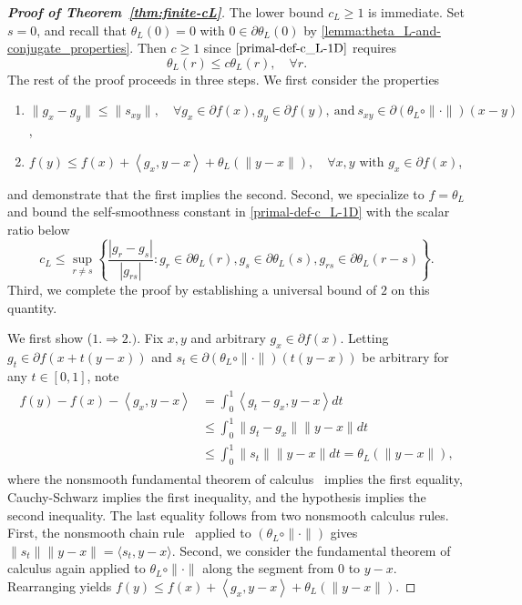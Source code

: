 \documentclass[11pt, hidelinks]{article}
\numberwithin{equation}{section}
\theoremstyle{thmstyletwo}%
\numberwithin{equation}{section}
\newcommand{\inner}[2]{\left\langle {#1}, {#2} \right\rangle}
\begin{document}
\begin{proof}[{\bf Proof of Theorem~\ref{thm:finite-cL}}] 
The lower bound $c_L \geq 1$ is immediate. Set $s = 0$, and recall that $\theta_L(0) = 0$ with $0 \in \partial \theta_L(0)$ by \cref{lemma:theta_L-and-conjugate_properties}. Then $c \geq 1$ since $\eqref{primal-def-c_L-1D}$ requires $$\theta_L(r) \leq c \theta_L(r), \quad \forall r.$$
The rest of the proof proceeds in three steps. We first consider the properties
\begin{enumerate}
        \item $\|g_x-g_y\| \leq \|s_{xy}\|, \quad \forall g_x \in \partial f(x), g_y \in \partial f(y), \ \text{and} \ s_{xy}  \in \partial (\theta_L \circ \|\cdot\|)(x-y)$,
       \item $f(y) \leq f(x) + \inner{g_x}{y-x}+\theta_L(\|y-x\|), \quad \forall x,y \text{ with } g_x \in \partial f(x)$,
       \end{enumerate}
and demonstrate that the first implies the second. Second, we specialize to $f = \theta_L$ and bound the self-smoothness constant in \eqref{primal-def-c_L-1D} with the scalar ratio below
\begin{equation}\label{eq:c_L bound}c_L \leq \sup_{r \ne s} \left\{\frac{|g_r-g_s|}{|g_{rs}|} : g_r \in \partial \theta_L(r), g_s \in \partial \theta_L(s), g_{rs} \in \partial \theta_L(r-s)\right\}.\end{equation}
Third, we complete the proof by establishing a universal bound of $2$ on this quantity.


We first show ($1. \Longrightarrow 2.)$. Fix $x,y$ and arbitrary $g_x \in \partial f(x)$. Letting $g_t \in \partial f(x+t(y-x))$ and $s_{t} \in \partial (\theta_L \circ \|\cdot\|)(t(y-x))$ be arbitrary for any $ t\in [0,1]$, note
\begin{align}\label{application_nonsmooth_FTC}
\begin{split}
    f(y)-f(x)-\inner{g_x}{y-x}&=\int_0^1 \inner{g_t-g_x}{y-x}dt\\
    &\leq \int_0^1 \|g_t-g_x\|\|y-x\|dt\\
    &\leq \int_0^1 \|s_{t}\|\|y-x\|dt = \theta_L(\|y-x\|),
    \end{split}
\end{align}
where the nonsmooth fundamental theorem of calculus~\cite[Theorem 2.3.4]{fundamental_convex} implies the first equality, Cauchy-Schwarz implies the first inequality, and the hypothesis implies the second inequality. The last equality follows from two nonsmooth calculus rules. First, the nonsmooth chain rule~\cite[Corollary 16.72]{bauschke} applied to $(\theta_L \circ \|\cdot\|)$ gives $\|s_{t}\|\|y-x\| = \langle s_{t}, y-x\rangle$. Second, we consider the fundamental theorem of calculus again applied to $\theta_L \circ \|\cdot\|$ along the segment from $0$ to $y-x$. Rearranging yields $f(y) \leq f(x) + \inner{g_x}{y-x}+\theta_L(\|y-x\|)$.




\end{proof}
\end{document}
